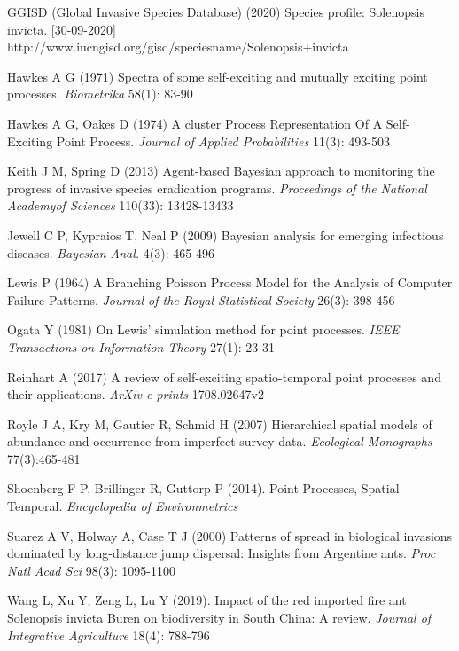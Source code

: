 \documentclass[11pt,a4paper]{article}
\begin{document}
\begin{thebibliography}{99}

 GGISD (Global Invasive Species Database) (2020) Species profile: Solenopsis invicta. [30-09-2020] http://www.iucngisd.org/gisd/speciesname/Solenopsis+invicta

 Hawkes A G (1971) Spectra of some self-exciting and mutually exciting point processes. \textit{Biometrika} 58(1): 83-90

 Hawkes A G, Oakes D (1974) A cluster Process Representation Of A Self-Exciting Point Process. \textit{Journal of Applied Probabilities} 11(3): 493-503

 Keith J M, Spring D (2013) Agent-based Bayesian approach to monitoring the progress of invasive species eradication programs. \textit{Proceedings of the National Academyof Sciences} 110(33): 13428-13433

 Jewell C P, Kypraios T, Neal P (2009) Bayesian analysis for emerging infectious diseases. \textit{Bayesian Anal.} 4(3): 465-496

 Lewis P (1964) A Branching Poisson Process Model for the Analysis of Computer Failure Patterns. \textit{Journal of the Royal Statistical Society} 26(3): 398-456

 Ogata Y (1981) On Lewis' simulation method for point processes. \textit{IEEE Transactions on Information Theory} 27(1): 23-31

 Reinhart A (2017) A review of self-exciting spatio-temporal point processes and their applications. \textit{ArXiv e-prints} 1708.02647v2

 Royle J A, Kry M, Gautier R, Schmid H (2007) Hierarchical spatial models of abundance and occurrence from imperfect survey data. \textit{Ecological Monographs} 77(3):465-481

 Shoenberg F P, Brillinger R, Guttorp P (2014). Point Processes, Spatial Temporal. \textit{Encyclopedia of Environmetrics}

 Suarez A V, Holway A, Case T J (2000) Patterns of spread in biological invasions dominated by long-distance jump dispersal: Insights from Argentine ants. \textit{Proc Natl Acad Sci} 98(3): 1095-1100

 Wang L, Xu Y, Zeng L, Lu Y (2019). Impact of the red imported fire ant Solenopsis invicta Buren on biodiversity in South China: A review. \textit{Journal of Integrative Agriculture} 18(4): 788-796


\end{thebibliography}
\end{document}
